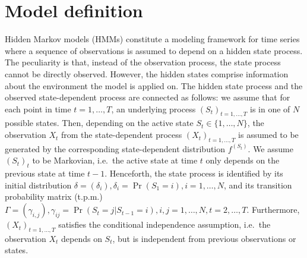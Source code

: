 \documentclass[article]{jss}
\begin{document}

\section{Model definition} \label{sec:model_definition} %

Hidden Markov models (HMMs) constitute a modeling framework for time series where a sequence of observations is assumed to depend on a hidden state process. The peculiarity is that, instead of the observation process, the state process cannot be directly observed. However, the hidden states comprise information about the environment the model is applied on. The hidden state process and the observed state-dependent process are connected as follows: we assume that for each point in time $t = 1, \ldots, T$, an underlying process $(S_t)_{t = 1, \ldots, T}$ is in one of $N$ possible states. Then, depending on the active state $S_t \in \{ 1, \ldots, N \}$, the observation $X_t$ from the state-dependent process $(X_t)_{t = 1, \ldots, T}$ is assumed to be generated by the corresponding state-dependent distribution $f^{(S_t)}$. We assume $(S_t)_t$ to be Markovian, i.e.\ the active state at time $t$ only depends on the previous state at time $t-1$. Henceforth, the state process is identified by its initial distribution $\delta = (\delta_i), \delta_i = \Pr(S_1 = i), i = 1, \ldots, N$, and its transition probability matrix (t.p.m.) $\Gamma = (\gamma_{i,j}), \gamma_{ij} = \Pr(S_{t} = j|S_{t-1}=i), i,j = 1, \ldots, N, t = 2, \ldots, T$. Furthermore, $(X_t)_{t = 1, \ldots, T}$ satisfies the conditional independence assumption, i.e.\ the observation $X_t$ depends on $S_t$, but is independent from previous observations or states.
\end{document}
